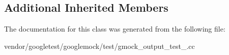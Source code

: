 \subsection*{Additional Inherited Members}


The documentation for this class was generated from the following file\+:\begin{DoxyCompactItemize}
\item 
vendor/googletest/googlemock/test/gmock\+\_\+output\+\_\+test\+\_\+.\+cc\end{DoxyCompactItemize}
